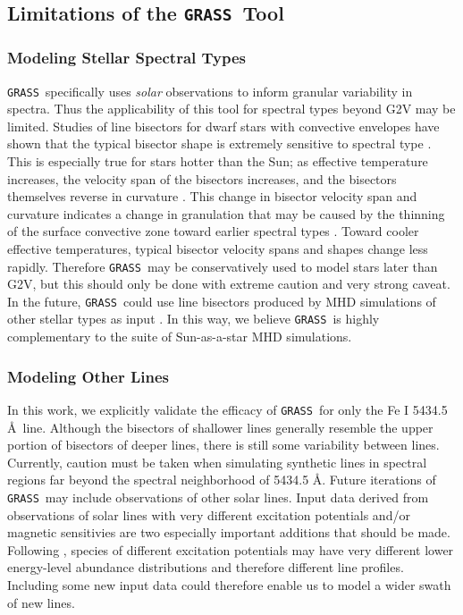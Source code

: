 \documentclass[twocolumn]{aastex63}
\newcommand{\grass}{\texttt{GRASS}}
\newcommand{\revise}[1]{#1}
\begin{document}
\subsection{Limitations of the \grass\ Tool} \label{subsec:limits}
\subsubsection{Modeling Stellar Spectral Types}
\grass\ specifically uses \textit{solar} observations to inform granular variability in spectra. Thus the applicability of this tool for spectral types beyond G2V may be limited. Studies of line bisectors for dwarf stars with convective envelopes have shown that the typical bisector shape is extremely sensitive to spectral type \citep[Figure 17.15 of][]{Gray2008}. This is especially true for stars hotter than the Sun; as effective temperature increases, the velocity span of the bisectors increases, and the bisectors themselves reverse in curvature \citep[Figure 17.16 of][]{Gray2008}. This change in bisector velocity span and curvature indicates a change in granulation that may be caused by the thinning of the surface convective zone toward earlier spectral types \citep{Kippenhahn2012}. Toward cooler effective temperatures, typical bisector velocity spans and shapes change less rapidly. Therefore \grass\ may be conservatively used to model stars later than G2V, but this should only be done with extreme caution and \revise{very} strong caveat. In the future, \grass\ could use line bisectors produced by MHD simulations of other stellar types as input \citep{Dravins2021}. In this way, we believe \grass\ is highly complementary to the suite of Sun-as-a-star MHD simulations. \par

\subsubsection{Modeling Other Lines}
In this work, we explicitly validate the efficacy of \grass\ for only the Fe \textsc{I} 5434.5 \AA\ line. Although the bisectors of shallower lines generally resemble the upper portion of bisectors of deeper lines, there is still some variability between lines. Currently, caution must be taken when simulating synthetic lines in spectral regions far beyond the spectral neighborhood of 5434.5 \AA. Future iterations of \grass\ may include observations of other solar lines. Input data derived from observations of solar lines with very different excitation potentials \revise{and/or magnetic sensitivies are two} especially important \revise{additions} that should be made. Following \citet{Gray2008}, species of different excitation potentials may have very different lower energy-level abundance distributions and therefore different line profiles. Including some new input data could therefore enable us to model a wider swath of new lines. \par 
\end{document}
